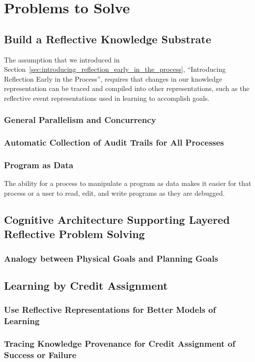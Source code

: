 \chapter{Problems to Solve}\label{ch:problems_to_solve}

\section{Build a Reflective Knowledge Substrate}

The assumption that we introduced in
Section~\ref{sec:introducing_reflection_early_in_the_process},
``Introducing Reflection Early in the Process'', requires that changes
in our knowledge representation can be traced and compiled into other
representations, such as the reflective event representations used in
learning to accomplish goals.

\subsection{General Parallelism and Concurrency}

\subsection{Automatic Collection of Audit Trails for All Processes}

\subsection{Program as Data}

The ability for a process to manipulate a program as data makes it
easier for that process or a user to read, edit, and write programs as
they are debugged.


\section{Cognitive Architecture Supporting Layered Reflective Problem Solving}

\subsection{Analogy between Physical Goals and Planning Goals}


\section{Learning by Credit Assignment}

\subsection{Use Reflective Representations for Better Models of Learning}

\subsection{Tracing Knowledge Provenance for Credit Assignment of Success or Failure}



